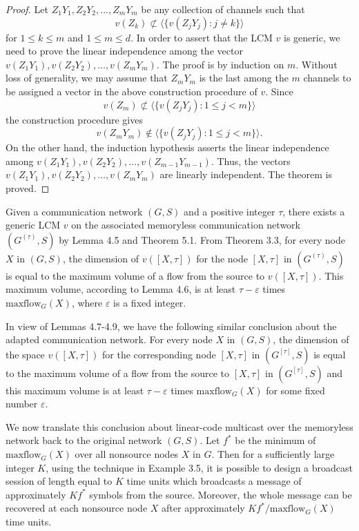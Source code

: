\documentclass[journal]{IEEEtran}
\newtheorem*{proof}{\hskip 2em Proof}
\begin{document}
\begin{proof}
\par
Let $Z_1Y_1, Z_2Y_2, \dots, Z_mY_m$ be any collection of channels such that
$$v(Z_k)\nsubset \langle \{ v(Z_jY_j):j\neq k\} \rangle$$
for $1\leq k \leq m$ and $1\leq m \leq d$. In order to assert that the LCM $v$ is generic, we need to prove the linear independence among the vector $v(Z_1Y_1), v(Z_2Y_2), \dots, v(Z_mY_m)$. The proof is by induction on $m$. Without loss of generality, we may assume that $Z_mY_m$ is the last among the $m$ channels to be assigned a vector in the above construction procedure of $v$. Since
$$v(Z_m)\nsubset \langle \{v(Z_jY_j):1\leq j<m\} \rangle$$
the construction procedure gives
$$v(Z_mY_m)\notin \langle \{v(Z_jY_j):1\leq j<m\}\rangle.$$
On the other hand, the induction hypothesis asserts the linear independence among $v(Z_1Y_1),v(Z_2Y_2),\dots, v(Z_{m-1}Y_{m-1})$. Thus, the vectors $v(Z_1Y_1), v(Z_2Y_2), \dots, v(Z_mY_m)$ are linearly independent. The theorem is proved.
\end{proof}


\par
Given a communication network $(G,S)$ and a positive integer $\tau$, there exists a generic LCM $v$ on the associated memoryless communication network $(G^{(\tau)},S)$ by Lemma 4.5 and Theorem 5.1. From Theorem 3.3, for every node $X$ in $(G,S)$, the dimension of $v([X,\tau])$ for the node $[X,\tau]$ in $(G^{(\tau)},S)$ is equal to the maximum volume of a flow from the source to $v([X,\tau])$. This maximum volume, according to Lemma 4.6, is at least $\tau-\varepsilon$ times $\text{maxflow}_G(X)$, where $\varepsilon$ is a fixed integer.
\par
In view of Lemmas 4.7-4.9, we have the following similar conclusion about the adapted communication network. For every node $X$ in $(G,S)$, the dimension of the space $v([X,\tau])$ for the corresponding node $[X,\tau]$ in $(G^{[\tau]},S)$ is equal to the maximum volume of a flow from the source to $[X,\tau]$ in $(G^{[\tau]},S)$ and this maximum volume is at least $\tau-\varepsilon$ times $\text{maxflow}_G(X)$ for some fixed number $\varepsilon$.
\par
We now translate this conclusion about linear-code multicast over the memoryless network back to the original network $(G,S)$. Let $f^*$ be the minimum of $\text{maxflow}_G(X)$ over all nonsource nodes $X$ in $G$. Then for a sufficiently large integer $K$, using the technique in Example 3.5, it is possible to design a broadcast session of length equal to $K$ time units which broadcasts a message of approximately $Kf^*$ symbols from the source. Moreover, the whole message can be recovered at each nonsource node $X$ after approximately $Kf^* /\text{maxflow}_G(X)$ time units.
\end{document}
